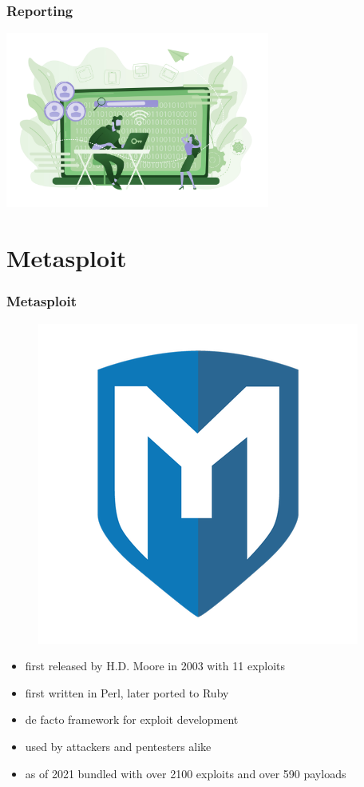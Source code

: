 \documentclass[handout]{beamer}
\begin{document}
\begin{frame}
	\frametitle{Reporting}


	\centering
	\includegraphics[width=0.65\textwidth]{../drawable/decorations/image-exploit-altcolor.jpg}
\end{frame}

\section{Metasploit}

\begin{frame}
	\frametitle{Metasploit}

	\begin{figure}[h]
		\centering
		\includegraphics[width=.25\textwidth]{../drawable/logos/metasploit-logo.png}
	\end{figure}

	\begin{itemize}
		\item<2-> first released by H.D. Moore in 2003 with 11 exploits
		\item<3-> first written in Perl, later ported to Ruby
		\item<4-> de facto framework for exploit development
		\item<5-> used by attackers and pentesters alike
		\item<6-> as of 2021 bundled with over 2100 exploits and over 590 payloads
	\end{itemize}
\end{frame}
\end{document}
